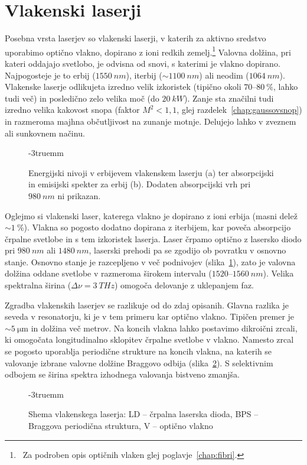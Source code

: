 \section{Vlakenski laserji}
Posebna vrsta laserjev so vlakenski laserji, v katerih za aktivno 
sredstvo uporabimo optično vlakno, dopirano z ioni redkih zemelj.\footnote{~Za
podroben opis optičnih vlaken glej poglavje~\ref{chap:fibri}.}
Valovna dolžina, pri kateri oddajajo svetlobo, je odvisna od snovi, s katerimi
je vlakno dopirano. Najpogosteje je to erbij ($1550~\si{nm}$),
iterbij ($\sim 1100~\si{nm}$) ali neodim ($1064~\si{nm}$).
Vlakenske laserje odlikujeta 
izredno velik izkoristek (tipično okoli $70$--$80~\%$, lahko tudi več) 
in posledično zelo velika moč (do $20~\si{kW}$). Zanje sta značilni tudi
izredno velika kakovost snopa (faktor $M^2<1,1$, glej 
razdelek~\ref{chap:gaussovsnop}) in 
razmeroma majhna občutljivost na zunanje motnje. Delujejo lahko v zveznem
ali sunkovnem načinu.

\begin{figure}[ht]
\centering
\def\svgwidth{110truemm} 

\caption{Energijski nivoji v erbijevem vlakenskem laserju (a) ter 
absorpcijski in emisijski spekter za erbij (b). Dodaten absorpcijski 
vrh pri $980~\si{nm}$ ni prikazan.}
\label{fig:ErFib}
\vglue-3truemm
\end{figure} 

Oglejmo si vlakenski laser, katerega vlakno je dopirano z ioni erbija 
(masni delež $\sim 1~\%$). Vlakna so pogosto dodatno dopirana z iterbijem, kar
poveča absorpcijo črpalne svetlobe in s tem izkoristek laserja. Laser črpamo
optično z lasersko diodo pri $980~\si{nm}$ ali $1480~\si{nm}$, laserski prehodi 
pa se zgodijo ob povratku v osnovno stanje. Osnovno stanje je razcepljeno v več podnivojev
(slika~\ref{fig:ErFib}), zato je valovna dolžina oddane svetlobe v razmeroma 
širokem intervalu ($1520$--$1560~\si{nm}$). Velika spektralna širina 
($\Delta \nu = 3~\si{THz}$)
omogoča delovanje z uklepanjem faz. 

Zgradba vlakenskih laserjev se razlikuje od do zdaj opisanih. Glavna razlika je
seveda v resonatorju, ki je v tem primeru kar optično vlakno. Tipičen premer je 
$\sim 5~\si{\micro\meter}$ in dolžina več metrov. Na koncih vlakna lahko
postavimo dikroični zrcali, ki omogočata longitudinalno sklopitev črpalne svetlobe 
v vlakno. Namesto zrcal se pogosto uporablja periodične strukture 
na koncih vlakna, na katerih se valovanje izbrane valovne dolžine Braggovo odbija
(slika~\ref{fig:Fibshema}). 
S selektivnim odbojem se širina spektra izhodnega valovanja bistveno zmanjša. 
\begin{figure}[ht]
\centering
\def\svgwidth{110truemm} 

\caption{Shema vlakenskega laserja: LD -- črpalna laserska dioda, 
BPS -- Braggova periodična struktura, V -- optično vlakno
}
\label{fig:Fibshema}
\vglue-3truemm
\end{figure}

